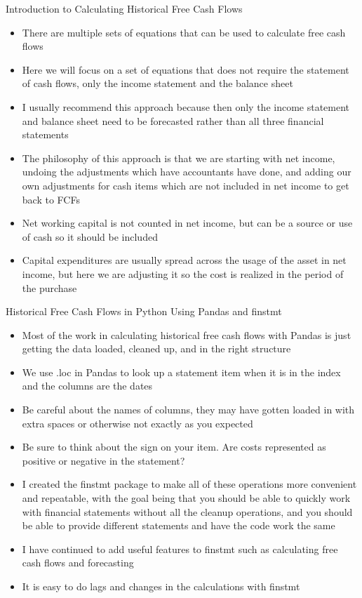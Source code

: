 \documentclass[]{article}
\begin{document}
\begin{section}{Introduction to Calculating Historical Free Cash Flows}
\begin{itemize}
\item There are multiple sets of equations that can be used to calculate free cash flows
\item Here we will focus on a set of equations that does not require the statement of cash flows, only the income statement and the balance sheet
\item I usually recommend this approach because then only the income statement and balance sheet need to be forecasted rather than all three financial statements
\item The philosophy of this approach is that we are starting with net income, undoing the adjustments which have accountants have done, and adding our own adjustments for cash items which are not included in net income to get back to FCFs
\item Net working capital is not counted in net income, but can be a source or use of cash so it should be included
\item Capital expenditures are usually spread across the usage of the asset in net income, but here we are adjusting it so the cost is realized in the period of the purchase
\end{itemize}
\end{section}
\begin{section}{Historical Free Cash Flows in Python Using Pandas and finstmt}
\begin{itemize}
\item Most of the work in calculating historical free cash flows with Pandas is just getting the data loaded, cleaned up, and in the right structure
\item We use .loc in Pandas to look up a statement item when it is in the index and the columns are the dates
\item Be careful about the names of columns, they may have gotten loaded in with extra spaces or otherwise not exactly as you expected
\item Be sure to think about the sign on your item. Are costs represented as positive or negative in the statement?
\item I created the finstmt package to make all of these operations more convenient and repeatable, with the goal being that you should be able to quickly work with financial statements without all the cleanup operations, and you should be able to provide different statements and have the code work the same
\item I have continued to add useful features to finstmt such as calculating free cash flows and forecasting
\item It is easy to do lags and changes in the calculations with finstmt
\end{itemize}
\end{section}
\end{document}
